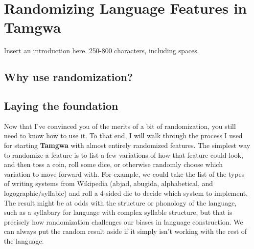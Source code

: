 \documentclass[a4paper,12pt,twoside,openright]{memoir}
\begin{document}


\chapter[Randomizing Language Features][Tamgwa]{Randomizing Language Features in Tamgwa}


\thispagestyle{fancy}
\BgUsetrue


Insert an introduction here. 250-800 characters, including spaces.

\section*{Why use randomization?} %

\lipsum[1]

\section*{Laying the foundation} %

Now that I've convinced you of the merits of a bit of randomization, you still need to know how to use it.  To that end, I will walk through the process I used for starting \textbf{Tamgwa} with almost entirely randomized features.  The simplest way to randomize a feature is to list a few variations of how that feature could look, and then toss a coin, roll some dice, or otherwise randomly choose which variation to move forward with.  For example, we could take the list of the types of writing systems from Wikipedia (abjad, abugida, alphabetical, and logographic/syllabic) and roll a 4-sided die to decide which system to implement.  The result might be at odds with the structure or phonology of the language, such as a syllabary for language with complex syllable structure, but that is precisely how randomization challenges our biases in language construction.  We can always put the random result aside if it simply isn't working with the rest of the language.
\end{document}
